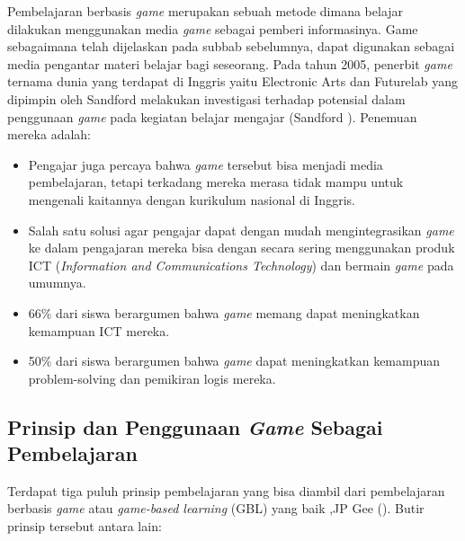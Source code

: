 	Pembelajaran berbasis \textit{game} merupakan sebuah metode dimana belajar dilakukan menggunakan media \textit{game} sebagai pemberi informasinya. Game sebagaimana telah dijelaskan pada subbab sebelumnya, dapat digunakan sebagai media pengantar materi belajar bagi seseorang. 
	\linebreak\linebreak
	Pada tahun 2005, penerbit \textit{game} ternama dunia yang terdapat di Inggris yaitu Electronic Arts dan Futurelab yang dipimpin oleh Sandford melakukan investigasi terhadap potensial dalam penggunaan \textit{game} pada kegiatan belajar mengajar (Sandford \citeyear{paper.futurelab}). Penemuan mereka adalah:
	\begin{itemize}
		\item Pengajar juga percaya bahwa \textit{game} tersebut bisa menjadi media pembelajaran, tetapi terkadang mereka merasa tidak mampu untuk mengenali kaitannya dengan kurikulum nasional di Inggris.
		\item Salah satu solusi agar pengajar dapat dengan mudah mengintegrasikan \textit{game} ke dalam pengajaran mereka bisa dengan secara sering menggunakan produk ICT (\textit{Information and Communications Technology}) dan bermain \textit{game} pada umumnya.
		\item 66\% dari siswa berargumen bahwa \textit{game} memang dapat meningkatkan kemampuan ICT mereka.
		\item 50\% dari siswa berargumen bahwa \textit{game} dapat meningkatkan kemampuan problem-solving dan pemikiran logis mereka.
	\end{itemize}
	
	\subsection{Prinsip dan Penggunaan \textit{Game} Sebagai Pembelajaran}
	
	Terdapat tiga puluh prinsip pembelajaran yang bisa diambil dari pembelajaran berbasis \textit{game} atau \textit{game-based learning} (GBL) yang baik ,JP Gee (\citeyear{papper.jpgee}). Butir prinsip tersebut antara lain:
	
